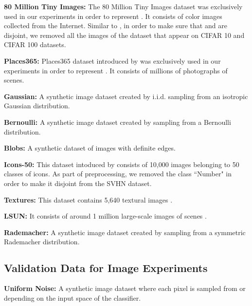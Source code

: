 \documentclass{article} \usepackage{iclr2020_conference,times}
\begin{document}
\textbf{80 Million Tiny Images: }The 80 Million Tiny Images dataset \citep{Torralba:2008:MTI:1444381.1444403} was exclusively used in our experiments in order to represent . It consists of  color images collected from the Internet. Similar to \citet{hendrycks2019oe}, in order to make sure that  and  are disjoint, we removed all the images of the dataset that appear on CIFAR 10 and CIFAR 100 datasets. 
\vspace{-15pt}

\textbf{Places365: }Places365 dataset introduced by \citet{7968387} was exclusively used in our experiments in order to represent . It consists of millions of photographs of scenes.
\vspace{-5pt}

\textbf{Gaussian: }A synthetic image dataset created by i.i.d. sampling from an isotropic Gaussian distribution. 
\vspace{-5pt}

\textbf{Bernoulli: }A synthetic image dataset created by sampling from a Bernoulli distribution.
\vspace{-5pt}

\textbf{Blobs: }A synthetic dataset of images with definite edges.
\vspace{-5pt}

\textbf{Icons-50: }This dataset intoduced by \citet{2018arXiv180701697H} consists of 10,000 images belonging to 50 classes of icons. As part of preprocessing, we removed the class ``Number" in order to make it disjoint from the SVHN dataset.
\vspace{-5pt}

\textbf{Textures: }This dataset contains 5,640 textural images \citep{Cimpoi:2014:DTW:2679600.2680059}.
\vspace{-5pt}

\textbf{LSUN: }It consists of around 1 million large-scale images of scenes \citep{yu15lsun}.
\vspace{-5pt}

\textbf{Rademacher: }A synthetic image dataset created by sampling from a symmetric Rademacher distribution.

\subsection{Validation Data for Image Experiments}\label{val_image}
\textbf{Uniform Noise:} A synthetic image dataset where each pixel is sampled from  or  depending on the input space of the classifier.
\vspace{-5pt}
\end{document}
